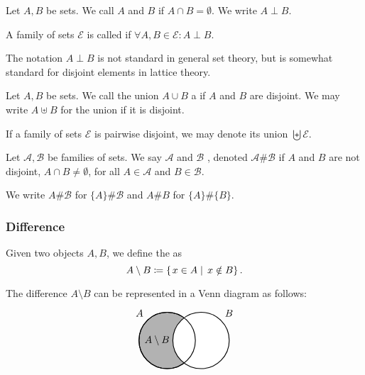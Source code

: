 \begin{definition}
Let $A,B$ be sets. We call $A$ and $B$  if $A\cap B = \emptyset$. We write $A\perp B$.

A family of sets $\mathcal{E}$ is called  if $\forall A,B\in\mathcal{E}: A\perp B$.
\end{definition}
The notation $A\perp B$ is not standard in general set theory, but is somewhat standard for disjoint elements in lattice theory.

\begin{definition}
Let $A,B$ be sets. We call the union $A\cup B$ a  if $A$ and $B$ are disjoint. We may write $A\uplus B$ for the union if it is disjoint.

If a family of sets $\mathcal{E}$ is pairwise disjoint, we may denote its union $\biguplus \mathcal{E}$.
\end{definition}

\begin{definition}
Let $\mathcal{A},\mathcal{B}$ be families of sets. We say $\mathcal{A}$ and $\mathcal{B}$ , denoted $\mathcal{A} \# \mathcal{B}$ if $A$ and $B$ are not disjoint, $A\cap B \neq \emptyset$, for all $A\in \mathcal{A}$ and $B\in\mathcal{B}$.

We write $A \# \mathcal{B}$ for $\{A\}\# \mathcal{B}$ and $A\# B$ for $\{A\}\#\{B\}$.
\end{definition}

\subsubsection{Difference}
\begin{definition}
Given two objects $A,B$, we define the  as
\[A\setminus B \coloneqq \left\{\left.  x\in A \;\right|\; x\notin B \right\}. \]
\end{definition}
The difference $A\setminus B$ can be represented in a Venn diagram as follows:
\[ \begin{tikzpicture}[thick,
    set/.style = {circle,
        minimum size = 2cm}]

\node[set,draw,fill=black!30,label={135:$A$}] (A) at (0,0) {};

\node[set,draw,fill=white,label={45:$B$}] (B) at (1.2,0) {};

\draw (0,0) circle(1cm);

\node at (-0.36,0) {$A\setminus B$};
\end{tikzpicture} \]

